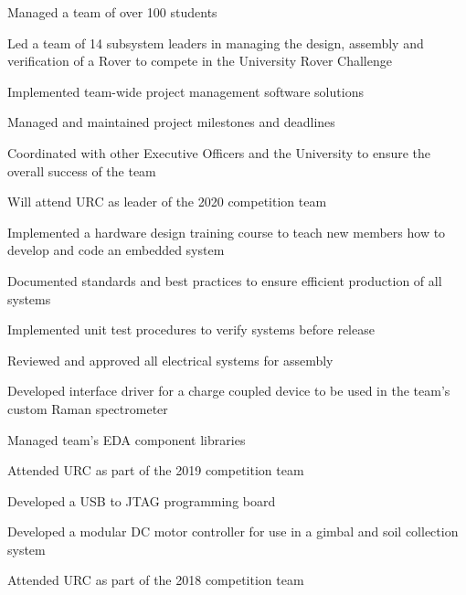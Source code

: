 \documentclass[]{deedy-resume-andrewvanhorn}
\begin{document}
\begin{minipage}[t]{0.66\textwidth}
\begin{tightemize}
	\item Managed a team of over 100 students
	\item Led a team of 14 subsystem leaders in managing the design, assembly and verification of a Rover to compete in the University Rover Challenge
	\item Implemented team-wide project management software solutions
	\item Managed and maintained project milestones and deadlines
	\item Coordinated with other Executive Officers and the University to ensure the overall success of the team
	\item Will attend URC as leader of the 2020 competition team
\end{tightemize}
\begin{tightemize}
	\item Implemented a hardware design training course to teach new members how to develop and code an embedded system
	\item Documented standards and best practices to ensure efficient production of all systems
	\item Implemented unit test procedures to verify systems before release
	\item Reviewed and approved all electrical systems for assembly
	\item Developed interface driver for a charge coupled device to be used in the team's custom Raman spectrometer
	\item Managed team's EDA component libraries
	\item Attended URC as part of the 2019 competition team
\end{tightemize}
\begin{tightemize}
	\item Developed a USB to JTAG programming board
	\item Developed a modular DC motor controller for use in a gimbal and soil collection system
	\item Attended URC as part of the 2018 competition team
\end{tightemize}
\sectionsep


\end{minipage}
\end{document}
